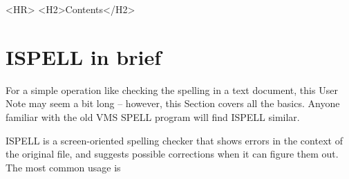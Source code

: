 \documentclass[twoside,11pt]{article}
\newcommand{\stardocinitials}  {SUN}
\newcommand{\stardocnumber}    {189.3}
\newcommand{\stardocabstract}  {[Text of abstract]}
\newcommand{\stardocname}{\stardocinitials /\stardocnumber}
\newcommand{\htmladdimg}[1]{}
\newenvironment{latexonly}{}{}
\newcommand{\htmlref}[2]{#1}
\newcommand{\htmladdtonavigation}[1]{}
\newcommand{\xlabel}[1]{}
\newcommand{\sunspec}[2]{#1}
\newcommand{\sunspec}[2]{#2}
\renewcommand{\thepage}{\roman{page}}
\begin{document}
\begin{htmlonly}
  \label{stardoccontents}
  \begin{rawhtml}
    <HR>
    <H2>Contents</H2>
  \end{rawhtml}
  \htmladdtonavigation{\htmlref{\htmladdimg{contents_motif.gif}}
        {stardoccontents}}

\end{htmlonly}

\newpage
\begin{latexonly}
   \setlength{\parskip}{0mm}
   \tableofcontents
   \setlength{\parskip}{\medskipamount}
   \markright{\stardocname}
\end{latexonly}
\newpage
\renewcommand{\thepage}{\arabic{page}}
\setcounter{page}{1}

\section{ISPELL in brief}

For a simple operation like checking the spelling in a text document, this User
Note may seem a bit long \sunspec{--}{-} however, this Section covers all the
basics.
Anyone familiar with the old VMS SPELL program will find ISPELL similar.

ISPELL is a screen-oriented spelling checker that shows errors in the context
of the original file, and suggests possible corrections when it can figure
them out.  The most common usage is
\end{document}
